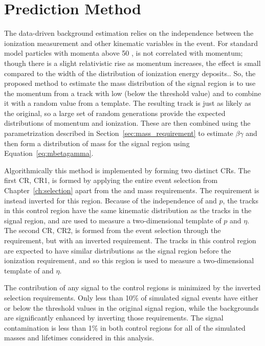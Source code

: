 
\section{Prediction Method}
\label{sec:background_method}
The data-driven background estimation relies on the independence between the ionization measurement and other kinematic variables in the event.
For standard model particles with momenta above 50 \GeV, \dedx is not correlated with momentum; though there is a slight relativistic rise as momentum increases, the effect is small compared to the width of the distribution of ionization energy deposits..
So, the proposed method to estimate the mass distribution of the signal region is to use the momentum from a track with low \dedx (below the threshold value) and to combine it with a random \dedx value from a \dedx template.
The resulting track is just as likely as the original, so a large set of random generations provide the expected distributions of momentum and ionization.
These are then combined using the parametrization described in Section~\ref{sec:mass_requirement} to estimate $\beta\gamma$ and then form a distribution of mass for the signal region using Equation~\ref{eq:mbetagamma}.

Algorithmically this method is implemented by forming two distinct \acp{CR}.
The first \ac{CR}, CR1, is formed by applying the entire event selection from Chapter~\ref{ch:selection} apart from the \dedx and mass requirements.
The \dedx requirement is instead inverted for this region.
Because of the independence of \dedx and $p$, the tracks in this control region have the same kinematic distribution as the tracks in the signal region, and are used to measure a two-dimensional template of $p$ and $\eta$. 
The second \ac{CR}, CR2, is formed from the event selection through the \dedx requirement, but with an inverted \met requirement.
The tracks in this control region are expected to have similar \dedx distributions as the signal region before the ionization requirement, and so this region is used to measure a two-dimensional template of \dedx and $\eta$. 

The contribution of any signal to the control regions is minimized by the inverted selection requirements.
Only less than 10\% of simulated signal events have either \dedx or \met below the threshold values in the original signal region, while the backgrounds are significantly enhanced by inverting those requirements.
The signal contamination is less than 1\% in both control regions for all of the simulated masses and lifetimes considered in this analysis.

